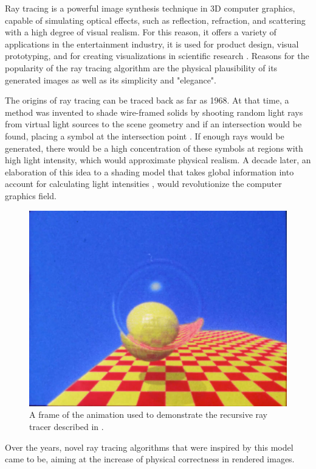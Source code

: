 \label{chap:intro}

Ray tracing is a powerful image synthesis technique in 3D computer graphics, capable of simulating optical effects, such as reflection, refraction, and scattering with a high degree of visual realism. For this reason, it offers a variety of applications in the entertainment industry, it is used for product design, visual prototyping, and for creating visualizations in scientific research \cite[pp 91-128]{peddie2019ray}. Reasons for the popularity of the ray tracing algorithm are the physical plausibility of its generated images as well as its simplicity and "elegance". 

The origins of ray tracing can be traced back as far as 1968. At that time, a method was invented to shade wire-framed solids by shooting random light rays from virtual light sources to the scene geometry and if an intersection would be found, placing a symbol at the intersection point \cite{appel1968some}. If enough rays would be generated, there would be a high concentration of these symbols at regions with high light intensity, which would approximate physical realism. 
A decade later, an elaboration of this idea to a shading model that takes global information into account for calculating light intensities \cite{whitted1979improved}, would revolutionize the computer graphics field.

\begin{figure}
	\centering
	\includegraphics[width=.7\linewidth]{img/0 introduction/whitted_}
	\caption{A frame of the animation used to demonstrate the recursive ray tracer described in \cite{whitted1979improved}.\cite{raytracingvideo}}
	\label{fig:g}
\end{figure}

Over the years, novel ray tracing algorithms that were inspired by this model came to be, aiming at the increase of physical correctness in rendered images. 

